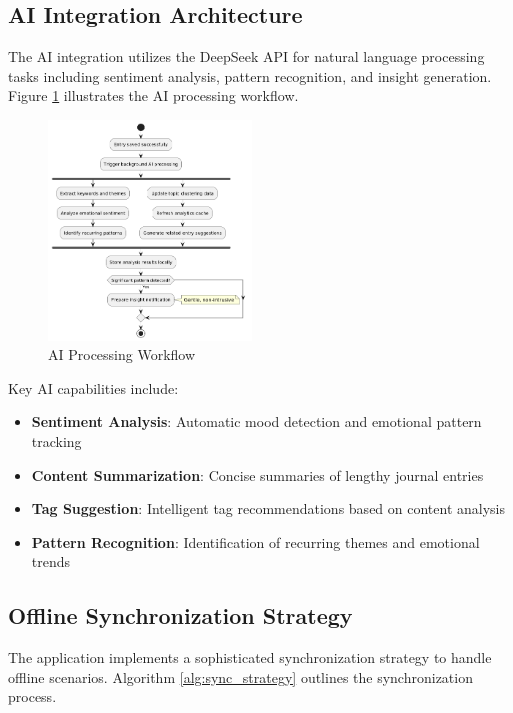 \documentclass[conference]{IEEEtran}
\begin{document}
{\begin{IEEEkeywords}
\subsection{AI Integration Architecture}

The AI integration utilizes the DeepSeek API for natural language processing tasks including sentiment analysis, pattern recognition, and insight generation. Figure \ref{fig:ai_processing} illustrates the AI processing workflow.

\begin{figure}[htbp]
\centerline{\includegraphics[width=0.48\textwidth]{ai_processing_flow.png}}
\caption{AI Processing Workflow}
\label{fig:ai_processing}
\end{figure}

Key AI capabilities include:
\begin{itemize}
\item \textbf{Sentiment Analysis}: Automatic mood detection and emotional pattern tracking
\item \textbf{Content Summarization}: Concise summaries of lengthy journal entries
\item \textbf{Tag Suggestion}: Intelligent tag recommendations based on content analysis
\item \textbf{Pattern Recognition}: Identification of recurring themes and emotional trends
\end{itemize}

\subsection{Offline Synchronization Strategy}

The application implements a sophisticated synchronization strategy to handle offline scenarios. Algorithm \ref{alg:sync_strategy} outlines the synchronization process.


\end{IEEEkeywords}}
\end{document}
